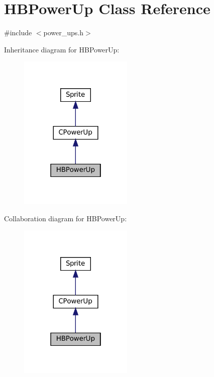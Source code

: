 \hypertarget{classHBPowerUp}{}\section{H\+B\+Power\+Up Class Reference}
\label{classHBPowerUp}


{\ttfamily \#include $<$power\+\_\+ups.\+h$>$}



Inheritance diagram for H\+B\+Power\+Up\+:\nopagebreak
\begin{figure}[H]
\begin{center}
\leavevmode
\includegraphics[width=154pt]{classHBPowerUp__inherit__graph}
\end{center}
\end{figure}


Collaboration diagram for H\+B\+Power\+Up\+:\nopagebreak
\begin{figure}[H]
\begin{center}
\leavevmode
\includegraphics[width=154pt]{classHBPowerUp__coll__graph}
\end{center}
\end{figure}
